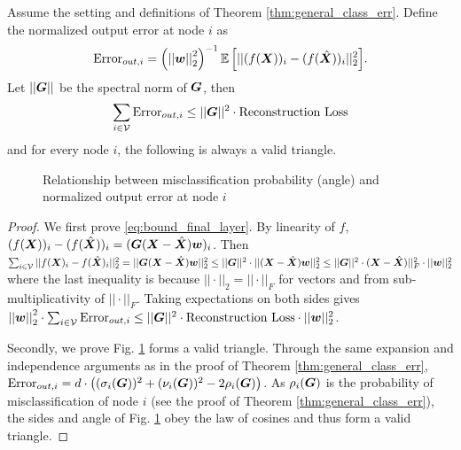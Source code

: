 \begin{corollary}
\label{corr:relationship}
    Assume the setting and definitions of Theorem \ref{thm:general_class_err}. 
    Define the normalized output error at node $i$ as 
    \begin{equation}
    \text{Error}_{out, i} = \left(\sqnormvec{\vect{w}}\right)^{-1}{\expect{||(f(\matr{X}))_i - (f(\hat{\matr{X}}))_i||^{2}_{2}}}. 
    \end{equation}
Let $||\bm{G}||$ be the spectral norm of $\bm{G}$, then
\begin{equation}
\label{eq:bound_final_layer}
\sum_{i \in \mathcal{V}} \text{Error}_{out,i} \leq ||\bm{G}||^{2} \cdot \text{Reconstruction Loss}
\end{equation}
and for every node $i$, the following is always a valid triangle.
\begin{figure}[H]
    \centering
    
    \caption{Relationship between misclassification probability (angle) and normalized output error at node $i$}
    \label{fig:class_rec_rel_fig}
\end{figure}

\end{corollary}
\begin{proof}
    We first prove \eqref{eq:bound_final_layer}. %
    By linearity of $f$, $(f(\bm{X}))_i - (f(\hat{\bm{X}}))_i = (\bm{G}(\bm{X} - \hat{\bm{X}})\bm{w})_{i}$. Then  $\sum_{i \in \mathcal{V}} ||f(\bm{X})_{i} - f(\hat{\bm{X}})_{i} ||_{2}^{2} = ||\bm{G}(\bm{X} - \hat{\bm{X}})\bm{w}||_{2}^{2} \leq ||\bm{G}||^{2}\cdot ||(\bm{X} - \hat{\bm{X}})\bm{w}||_{2}^{2} \leq ||\bm{G}||^{2} \cdot (\bm{X} - \hat{\bm{X}})||_{F}^{2} \cdot ||\bm{w}||_{2}^{2}$ where the last inequality is because $||\cdot||_{2} = ||\cdot||_{F}$ for vectors and from sub-multiplicativity of $||\cdot||_{F}$. Taking expectations on both sides gives $ \left\lvert\left\lvert\bm{w}\right\rvert\right\rvert^{2}_{2} \cdot \sum_{i \in \mathcal{V}} \text{Error}_{out,i} \leq ||\bm{G}||^{2} \cdot  \text{Reconstruction Loss} \cdot ||\bm{w}||_{2}^{2}$. 

    Secondly, we prove Fig. \ref{fig:class_rec_rel_fig} forms a valid triangle. Through the same expansion and independence arguments as in the proof of Theorem \ref{thm:general_class_err}, $\text{Error}_{out,i} = d\cdot \left((\sigma_{i}(\bm{G}))^{2} + (\nu_{i}(\bm{G}))^{2} - 2\rho_{i}(\bm{G}) \right)$. As $\rho_{i}(\bm{G})$ is the probability of misclassification of node $i$ (see the proof of Theorem \ref{thm:general_class_err}), the sides and angle of Fig. \ref{fig:class_rec_rel_fig} obey the law of cosines and thus form a valid triangle.
\end{proof}


